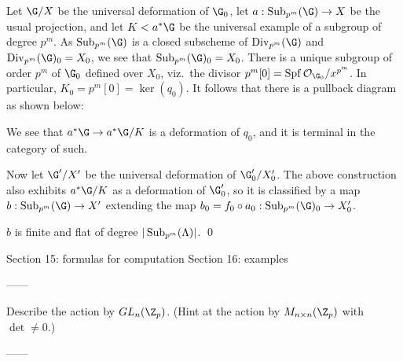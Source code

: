 Let $\G/X$ be the universal deformation of $\G_0$, let $a: \Sub_{p^m}(\G) \to X$ be the usual projection, and let $K < a^* \G$ be the universal example of a subgroup of degree $p^m$.  As $\Sub_{p^m}(\G)$ is a closed subscheme of $\Div_{p^m}(\G)$ and $\Div_{p^m}(\G)_0 = X_0$, we see that $\Sub_{p^m}(\G)_0 = X_0$.  There is a unique subgroup of order $p^m$ of $\G_0$ defined over $X_0$, viz.\ the divisor $p^m[0] = \Spf \sheaf O_{\G_0} / x^{p^m}$.  In particular, $K_0 = p^m[0] = \ker(q_0)$.  It follows that there is a pullback diagram as shown below:
\begin{center}
\end{center}
We see that $a^* \G \to a^* \G/K$ is a deformation of $q_0$, and it is terminal in the category of such.

Now let $\G' / X'$ be the universal deformation of $\G'_0 / X'_0$.  The above construction also exhibits $a^* \G/K$ as a deformation of $\G'_0$, so it is classified by a map $b: \Sub_{p^m}(\G) \to X'$ extending the map $b_0 = f_0 \circ a_0: \Sub_{p^m}(\G)_0 \to X'_0$.

\begin{theorem}
$b$ is finite and flat of degree $|\operatorname{Sub}_{p^m}(\Lambda)|$. \qed
\end{theorem}


Section 15: formulas for computation
Section 16: examples

------

Describe the action by $GL_n(\Z_p)$. (Hint at the action by $M_{n \times n}(\Z_p)$ with $\det \ne 0$.)

------

